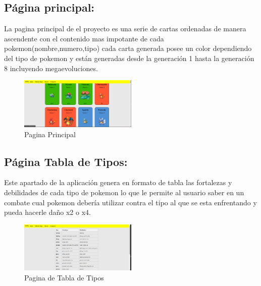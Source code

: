 \documentclass[12pt]{article}
\begin{document}
        \subsection{Página principal:}
        La pagina principal de el proyecto es una serie de cartas ordenadas de manera ascendente con el contenido mas impotante de cada pokemon(nombre,numero,tipo) cada carta generada posee un color dependiendo del tipo de pokemon y están generadas desde la generación 1 hasta la generación 8 incluyendo megaevoluciones.
        \begin{figure}[h]
            \centering
            \includegraphics[width=0.5\textwidth]{img/homepage.png}
            \caption{Pagina Principal}
            \label{figure:homepage}
        \end{figure}

        \subsection{Página Tabla de Tipos:}
        Este apartado de la aplicación genera en formato de tabla las fortalezas y debilidades de cada tipo de pokemon lo que le permite al usuario saber en un combate cual pokemon debería utilizar contra el tipo al que se esta enfrentando y pueda hacerle daño x2 o x4.
        \begin{figure}[h]
            \centering
            \includegraphics[width=0.5\textwidth]{img/typepage.png}
            \caption{Pagina de Tabla de Tipos}
            \label{figure:typepage}
        \end{figure}
        \vspace{5cm}
\end{document}
